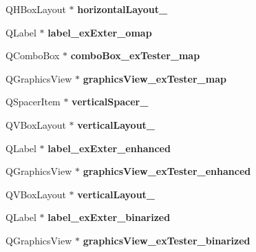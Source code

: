 \begin{DoxyCompactItemize}
Q\+H\+Box\+Layout $\ast$ {\bfseries horizontal\+Layout\+\_}
\item 
\mbox{\label{class_ui___main_window_ad477fbc764e950b65807b6a558e05982}} 
Q\+Label $\ast$ {\bfseries label\+\_\+ex\+Exter\+\_\+omap}
\item 
\mbox{\label{class_ui___main_window_adfb27b5f0aa7df2b3de850f72b712344}} 
Q\+Combo\+Box $\ast$ {\bfseries combo\+Box\+\_\+ex\+Tester\+\_\+map}
\item 
\mbox{\label{class_ui___main_window_a978cba0001e8b7a7f4b89aa61a2a3ee6}} 
Q\+Graphics\+View $\ast$ {\bfseries graphics\+View\+\_\+ex\+Tester\+\_\+map}
\item 
\mbox{\label{class_ui___main_window_a1d23e45ccda45e5c92e100ef6a9d8b00}} 
Q\+Spacer\+Item $\ast$ {\bfseries vertical\+Spacer\+\_}
\item 
\mbox{\label{class_ui___main_window_acac7e84539b2145a2b8dbf6e1427ab13}} 
Q\+V\+Box\+Layout $\ast$ {\bfseries vertical\+Layout\+\_}
\item 
\mbox{\label{class_ui___main_window_a1807d5575a60fb24872282b8af7bddff}} 
Q\+Label $\ast$ {\bfseries label\+\_\+ex\+Exter\+\_\+enhanced}
\item 
\mbox{\label{class_ui___main_window_ac27ceefd6121a67d3c70ce9b618f8fdc}} 
Q\+Graphics\+View $\ast$ {\bfseries graphics\+View\+\_\+ex\+Tester\+\_\+enhanced}
\item 
\mbox{\label{class_ui___main_window_addfaf57ac21b3b79d3fcc35a0f43e661}} 
Q\+V\+Box\+Layout $\ast$ {\bfseries vertical\+Layout\+\_}
\item 
\mbox{\label{class_ui___main_window_a8825aab3a9804e981a81fe3074cc3af0}} 
Q\+Label $\ast$ {\bfseries label\+\_\+ex\+Exter\+\_\+binarized}
\item 
\mbox{\label{class_ui___main_window_ad9093ab33b0cf75698a29eaf8c1fcf65}} 
Q\+Graphics\+View $\ast$ {\bfseries graphics\+View\+\_\+ex\+Tester\+\_\+binarized}

\end{DoxyCompactItemize}
